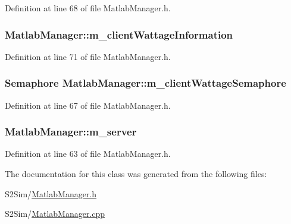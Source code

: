 Definition at line 68 of file Matlab\-Manager.\-h.

\hypertarget{class_matlab_manager_af4c255ddf41fda74a77367a17520d21f}{
\subsubsection[{m\-\_\-client\-Wattage\-Information}]{ Matlab\-Manager\-::m\-\_\-client\-Wattage\-Information\hspace{0.3cm}{\ttfamily [private]}}}\label{class_matlab_manager_af4c255ddf41fda74a77367a17520d21f}


Definition at line 71 of file Matlab\-Manager.\-h.

\hypertarget{class_matlab_manager_a476eb9e68029520e9032f58672b7829e}{
\subsubsection[{m\-\_\-client\-Wattage\-Semaphore}]{\setlength{\rightskip}{0pt plus 5cm}Semaphore Matlab\-Manager\-::m\-\_\-client\-Wattage\-Semaphore\hspace{0.3cm}{\ttfamily [private]}}}\label{class_matlab_manager_a476eb9e68029520e9032f58672b7829e}


Definition at line 67 of file Matlab\-Manager.\-h.

\hypertarget{class_matlab_manager_a2eea12132471953cf6cdb6effb7233f9}{
\subsubsection[{m\-\_\-server}]{ Matlab\-Manager\-::m\-\_\-server\hspace{0.3cm}{\ttfamily [private]}}}\label{class_matlab_manager_a2eea12132471953cf6cdb6effb7233f9}


Definition at line 63 of file Matlab\-Manager.\-h.



The documentation for this class was generated from the following files\-:\begin{DoxyCompactItemize}
\item 
S2\-Sim/\hyperlink{_matlab_manager_8h}{Matlab\-Manager.\-h}\item 
S2\-Sim/\hyperlink{_matlab_manager_8cpp}{Matlab\-Manager.\-cpp}\end{DoxyCompactItemize}
